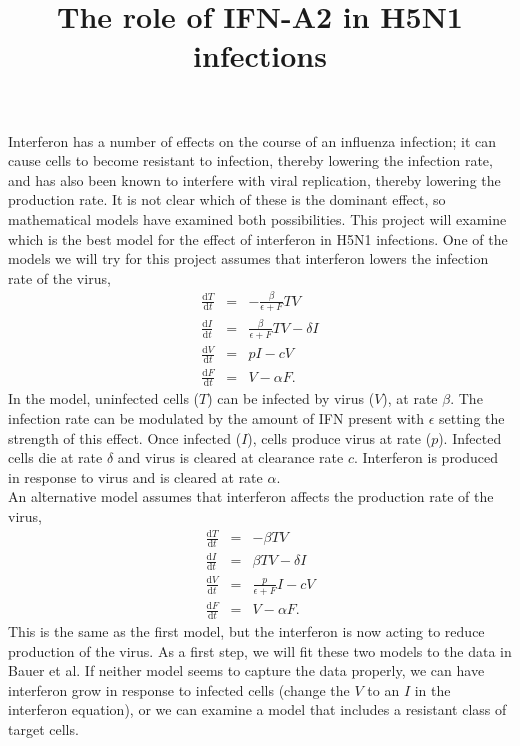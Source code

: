 \documentclass{article}
\newcommand{\bean}{\begin{eqnarray}}
\newcommand{\eean}{\end{eqnarray}}
\newcommand{\dif}{\ensuremath{\mathrm{d}}\xspace}
\begin{document}
\title{The role of IFN-A2 in H5N1 infections}

\maketitle
	
\noindent Interferon has a number of effects on the course of an influenza infection; it can cause cells to become resistant to infection, thereby lowering the infection rate, and has also been known to interfere with viral replication, thereby lowering the production rate. It is not clear which of these is the dominant effect, so mathematical models have examined both possibilities. This project will examine which is the best model for the effect of interferon in H5N1 infections. One of the models we will try for this project assumes that interferon lowers the infection rate of the virus,
\bean
\frac{\dif T}{\dif t} &=& - \frac{\beta}{\epsilon+F} T V \nonumber\\
\frac{\dif I}{\dif t} &=& \frac{\beta}{\epsilon+F} T V - \delta I \\
\frac{\dif V}{\dif t} &=& p I - cV \nonumber \\
\frac{\dif F}{\dif t} &=& V - \alpha F. \nonumber
\eean
In the model, uninfected cells ($T$) can be infected by virus ($V$), at rate $\beta$. The infection rate can be modulated by the amount of IFN present with $\epsilon$ setting the strength of this effect. Once infected ($I$), cells produce virus at rate ($p$). Infected cells die at rate $\delta$ and virus is cleared at clearance rate $c$. Interferon is produced in response to virus and is cleared at rate $\alpha$.\\

\noindent An alternative model assumes that interferon affects the production rate of the virus,
\bean
\frac{\dif T}{\dif t} &=& - \beta T V \nonumber\\
\frac{\dif I}{\dif t} &=& \beta T V - \delta I \\
\frac{\dif V}{\dif t} &=& \frac{p}{\epsilon+F} I - cV \nonumber \\
\frac{\dif F}{\dif t} &=& V - \alpha F. \nonumber
\eean
This is the same as the first model, but the interferon is now acting to reduce production of the virus. As a first step, we will fit these two models to the data in Bauer et al. If neither model seems to capture the data properly, we can have interferon grow in response to infected cells (change the $V$ to an $I$ in the interferon equation), or we can examine a model that includes a resistant class of target cells.\\
\end{document}
